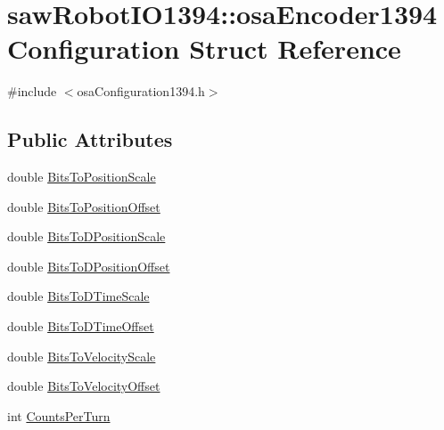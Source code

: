 \hypertarget{structsaw_robot_i_o1394_1_1osa_encoder1394_configuration}{}\section{saw\+Robot\+I\+O1394\+:\+:osa\+Encoder1394\+Configuration Struct Reference}
\label{structsaw_robot_i_o1394_1_1osa_encoder1394_configuration}


{\ttfamily \#include $<$osa\+Configuration1394.\+h$>$}

\subsection*{Public Attributes}
\begin{DoxyCompactItemize}
\item 
double \hyperlink{structsaw_robot_i_o1394_1_1osa_encoder1394_configuration_a2c22c3f7cb7acdc7fbe6d5d51a814ef1}{Bits\+To\+Position\+Scale}
\item 
double \hyperlink{structsaw_robot_i_o1394_1_1osa_encoder1394_configuration_a2b4e98b4878edc44508508c99e40205a}{Bits\+To\+Position\+Offset}
\item 
double \hyperlink{structsaw_robot_i_o1394_1_1osa_encoder1394_configuration_a3ae5e74c279903db875e33be6e2883aa}{Bits\+To\+D\+Position\+Scale}
\item 
double \hyperlink{structsaw_robot_i_o1394_1_1osa_encoder1394_configuration_a723c4a2ac007b9ac5384777f0721dfd7}{Bits\+To\+D\+Position\+Offset}
\item 
double \hyperlink{structsaw_robot_i_o1394_1_1osa_encoder1394_configuration_af81ac861e5e937302d9ff1cd7c588bd1}{Bits\+To\+D\+Time\+Scale}
\item 
double \hyperlink{structsaw_robot_i_o1394_1_1osa_encoder1394_configuration_a170dbb7e62ce29d27fc5b7b14f667ab5}{Bits\+To\+D\+Time\+Offset}
\item 
double \hyperlink{structsaw_robot_i_o1394_1_1osa_encoder1394_configuration_a746ed967a0547da052f09058b6c203ed}{Bits\+To\+Velocity\+Scale}
\item 
double \hyperlink{structsaw_robot_i_o1394_1_1osa_encoder1394_configuration_a63b455fc6fa30208293ab342efc83811}{Bits\+To\+Velocity\+Offset}
\item 
int \hyperlink{structsaw_robot_i_o1394_1_1osa_encoder1394_configuration_afd57b4ae73ec773c21015e4f7fbd33f9}{Counts\+Per\+Turn}
\end{DoxyCompactItemize}


